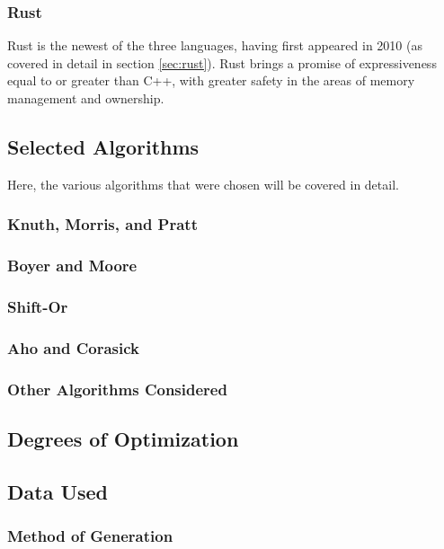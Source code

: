 \subsubsection{Rust}

Rust is the newest of the three languages, having first appeared in 2010 (as covered in detail in section \ref{sec:rust}). Rust brings a promise of expressiveness equal to or greater than C++, with greater safety in the areas of memory management and ownership.

\subsection{Selected Algorithms}

Here, the various algorithms that were chosen will be covered in detail.

\subsubsection{Knuth, Morris, and Pratt}

\subsubsection{Boyer and Moore}

\subsubsection{Shift-Or}

\subsubsection{Aho and Corasick}

\subsubsection{Other Algorithms Considered}

\subsection{Degrees of Optimization}

\subsection{Data Used}

\subsubsection{Method of Generation}

